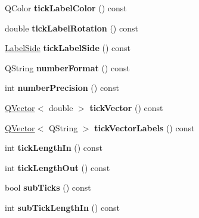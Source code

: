\begin{DoxyCompactItemize}
Q\+Color {\bfseries tick\+Label\+Color} () const
\item 
\mbox{\label{class_q_c_p_axis_a5c81e5d550266fdb9e11d96d1dc5713e}} 
double {\bfseries tick\+Label\+Rotation} () const
\item 
\mbox{\label{class_q_c_p_axis_acb78bdb20082432f574f0b6721193b41}} 
\hyperlink{class_q_c_p_axis_a24b13374b9b8f75f47eed2ea78c37db9}{Label\+Side} {\bfseries tick\+Label\+Side} () const
\item 
\mbox{\label{class_q_c_p_axis_a20cc29c2f282a0e9efd8f32145e47be6}} 
Q\+String {\bfseries number\+Format} () const
\item 
\mbox{\label{class_q_c_p_axis_a2562b6f3a4a01c7ed83a388042664998}} 
int {\bfseries number\+Precision} () const
\item 
\mbox{\label{class_q_c_p_axis_a5aad9d6b34821ab0751dfc38dbc92a46}} 
\hyperlink{class_q_vector}{Q\+Vector}$<$ double $>$ {\bfseries tick\+Vector} () const
\item 
\mbox{\label{class_q_c_p_axis_a1bd4a9036e0c9fc68b6f3df81f07e55f}} 
\hyperlink{class_q_vector}{Q\+Vector}$<$ Q\+String $>$ {\bfseries tick\+Vector\+Labels} () const
\item 
\mbox{\label{class_q_c_p_axis_ace2accb350fd3f3f474280f58c1d61c5}} 
int {\bfseries tick\+Length\+In} () const
\item 
\mbox{\label{class_q_c_p_axis_ad3ba6614ccddf351f133e0acdd4f021e}} 
int {\bfseries tick\+Length\+Out} () const
\item 
\mbox{\label{class_q_c_p_axis_ad74153c38fd83b54c509cff249370beb}} 
bool {\bfseries sub\+Ticks} () const
\item 
\mbox{\label{class_q_c_p_axis_af907c8ecc4624d1bf4a8f6f702e64fbe}} 
int {\bfseries sub\+Tick\+Length\+In} () const
\item 
\mbox{\label{class_q_c_p_axis_ac98c66cae50c98f3ae90e2969382976d}} 

\end{DoxyCompactItemize}
